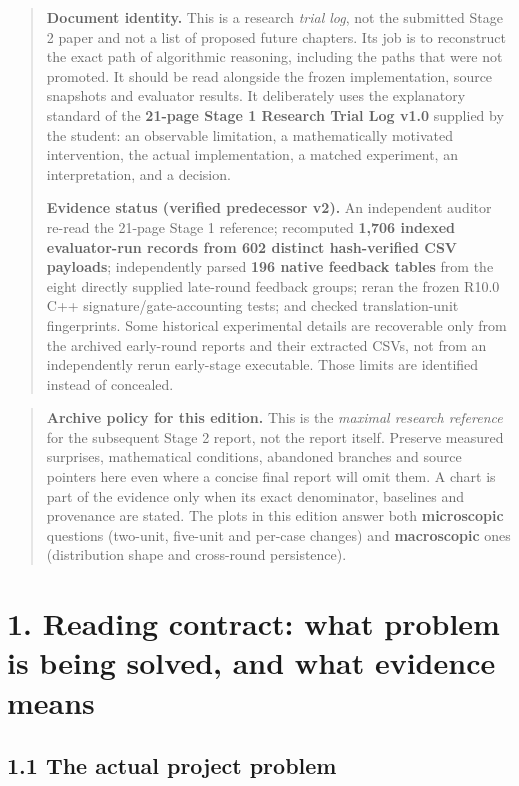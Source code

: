 \begin{quote}
\textbf{Document identity.} This is a research \emph{trial log}, not the submitted Stage 2 paper and not a list of proposed future chapters. Its job is to reconstruct the exact path of algorithmic reasoning, including the paths that were not promoted. It should be read alongside the frozen implementation, source snapshots and evaluator results. It deliberately uses the explanatory standard of the \textbf{21-page Stage 1 Research Trial Log v1.0} supplied by the student: an observable limitation, a mathematically motivated intervention, the actual implementation, a matched experiment, an interpretation, and a decision.

\textbf{Evidence status (verified predecessor v2).} An independent auditor re-read the 21-page Stage 1 reference; recomputed \textbf{1,706 indexed evaluator-run records from 602 distinct hash-verified CSV payloads}; independently parsed \textbf{196 native feedback tables} from the eight directly supplied late-round feedback groups; reran the frozen R10.0 C++ signature/gate-accounting tests; and checked translation-unit fingerprints. Some historical experimental details are recoverable only from the archived early-round reports and their extracted CSVs, not from an independently rerun early-stage executable. Those limits are identified instead of concealed.
\end{quote}

\begin{quote}
\textbf{Archive policy for this edition.} This is the \emph{maximal research reference} for the subsequent Stage 2 report, not the report itself. Preserve measured surprises, mathematical conditions, abandoned branches and source pointers here even where a concise final report will omit them. A chart is part of the evidence only when its exact denominator, baselines and provenance are stated. The plots in this edition answer both \textbf{microscopic} questions (two-unit, five-unit and per-case changes) and \textbf{macroscopic} ones (distribution shape and cross-round persistence).
\end{quote}

\section{1. Reading contract: what problem is being solved, and what evidence means}\label{reading-contract-what-problem-is-being-solved-and-what-evidence-means}

\subsection{1.1 The actual project problem}\label{the-actual-project-problem}

